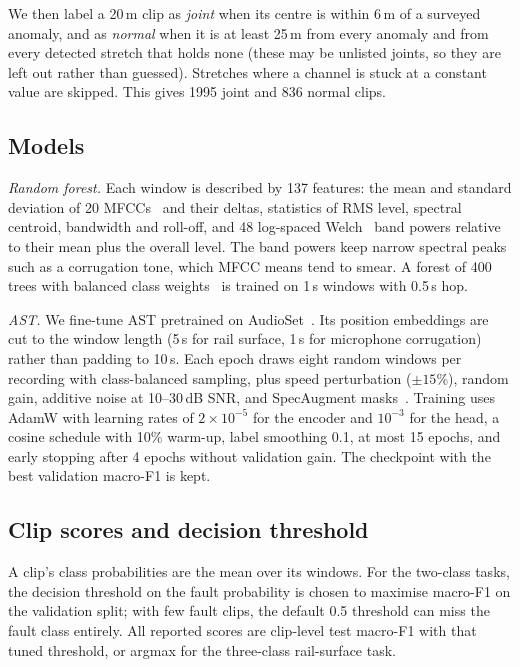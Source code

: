 \documentclass[conference]{IEEEtran}
\begin{document}
We then label a 20\,m clip as \emph{joint} when its centre is within 6\,m of a surveyed anomaly,
and as \emph{normal} when it is at least 25\,m from every anomaly and from every detected
stretch that holds none (these may be unlisted joints, so they are left out rather than guessed).
Stretches where a channel is stuck at a constant value are skipped. This gives 1995 joint and 836
normal clips.

\subsection{Models}
\textit{Random forest.} Each window is described by 137 features: the mean and standard
deviation of 20 MFCCs~\cite{davis1980} and their deltas, statistics of RMS level, spectral
centroid, bandwidth and roll-off, and 48 log-spaced Welch~\cite{welch1967} band powers relative
to their mean plus the overall level. The band powers keep narrow spectral peaks such as a
corrugation tone, which MFCC means tend to smear. A forest of 400 trees with balanced class
weights~\cite{breiman2001} is trained on 1\,s windows with 0.5\,s hop.

\textit{AST.} We fine-tune AST pretrained on AudioSet~\cite{gong2021ast,gemmeke2017audioset}. Its
position embeddings are cut to the window length (5\,s for rail surface, 1\,s for microphone
corrugation) rather than padding to 10\,s. Each epoch draws eight random windows per recording
with class-balanced sampling, plus speed perturbation ($\pm 15\%$), random gain, additive noise at
10--30\,dB SNR, and SpecAugment masks~\cite{park2019specaugment}. Training uses AdamW with learning
rates of $2\times10^{-5}$ for the encoder and $10^{-3}$ for the head, a cosine schedule with 10\%
warm-up, label smoothing 0.1, at most 15 epochs, and early stopping after 4 epochs without
validation gain. The checkpoint with the best validation macro-F1 is kept.

\subsection{Clip scores and decision threshold}
A clip's class probabilities are the mean over its windows. For the two-class tasks, the
decision threshold on the fault probability is chosen to maximise macro-F1 on the validation
split; with few fault clips, the default 0.5 threshold can miss the fault class entirely. All
reported scores are clip-level test macro-F1 with that tuned threshold, or argmax for the
three-class rail-surface task.
\end{document}
